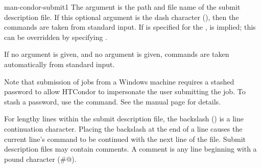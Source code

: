 \begin{ManPage}{}{man-condor-submit}{1}
The  argument is the path and file name of 
the submit description file. 
If this optional argument is the dash character (\Expr{-}),
then the commands are taken from standard input.  If \Expr{-} is
specified for the ,  is
implied; this can be overridden by specifying .

If no  argument is given, and no  argument
is given, commands are taken automatically from standard input.

Note that submission of jobs from a Windows machine requires
a stashed password to allow HTCondor to impersonate the user submitting
the job.
To stash a password, use the  command.
See the manual page for details.

For lengthy lines within the submit description file,
the backslash (\verb@\@) is a line continuation character.
Placing the backslash at the end of a line causes the current line's command
to be continued with the next line of the file.
Submit description files may contain comments.
A comment is any line beginning with a pound character (\verb@#@). 

\begin{Options}








\end{Options}
\end{ManPage}
